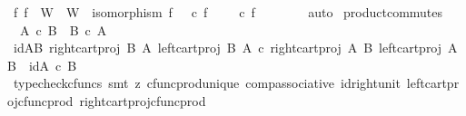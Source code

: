 \begin{isabellebody}
\ {\isachardoublequoteopen}{\isasymexists}f{\isachardot}{\kern0pt}\ f\ {\isacharcolon}{\kern0pt}\ W\ {\isasymrightarrow}\ W{\isacharprime}{\kern0pt}\ {\isasymand}\ isomorphism\ f\ {\isasymand}\ {\isasympi}{\isacharprime}{\kern0pt}\ {\isasymcirc}\isactrlsub c\ f\ {\isacharequal}{\kern0pt}\ {\isasympi}\ {\isasymand}\ {\isasympi}{\isacharprime}{\kern0pt}\ {\isasymcirc}\isactrlsub c\ f\ {\isacharequal}{\kern0pt}\ {\isasympi}\isanewline
\ \ \ \ \isamarkupfalse%
\ auto\isanewline
{}\isamarkupfalse%
%
\endisatagproof
{\isafoldproof}%
%
\isadelimproof
\isanewline
%
\endisadelimproof
\isanewline
{}\isamarkupfalse%
\ product{\isacharunderscore}{\kern0pt}commutes{\isacharcolon}{\kern0pt}\isanewline
\ \ {\isachardoublequoteopen}A\ {\isasymtimes}\isactrlsub c\ B\ {\isasymcong}\ B\ {\isasymtimes}\isactrlsub c\ A{\isachardoublequoteclose}\isanewline
%
\isadelimproof
%
\endisadelimproof
%
\isatagproof
{}\isamarkupfalse%
\ {\isacharminus}{\kern0pt}\isanewline
\ \ \isamarkupfalse%
\ id{\isacharunderscore}{\kern0pt}AB{\isacharcolon}{\kern0pt}\ {\isachardoublequoteopen}{\isasymlangle}right{\isacharunderscore}{\kern0pt}cart{\isacharunderscore}{\kern0pt}proj\ B\ A{\isacharcomma}{\kern0pt}\ left{\isacharunderscore}{\kern0pt}cart{\isacharunderscore}{\kern0pt}proj\ B\ A{\isasymrangle}\ {\isasymcirc}\isactrlsub c\ {\isasymlangle}right{\isacharunderscore}{\kern0pt}cart{\isacharunderscore}{\kern0pt}proj\ A\ B{\isacharcomma}{\kern0pt}\ left{\isacharunderscore}{\kern0pt}cart{\isacharunderscore}{\kern0pt}proj\ A\ B{\isasymrangle}\ {\isacharequal}{\kern0pt}\ id{\isacharparenleft}{\kern0pt}A\ {\isasymtimes}\isactrlsub c\ B{\isacharparenright}{\kern0pt}{\isachardoublequoteclose}\isanewline
\ \ \ \ \isamarkupfalse%
\ {\isacharparenleft}{\kern0pt}typecheck{\isacharunderscore}{\kern0pt}cfuncs{\isacharcomma}{\kern0pt}\ smt\ {\isacharparenleft}{\kern0pt}z{}{\isacharparenright}{\kern0pt}\ cfunc{\isacharunderscore}{\kern0pt}prod{\isacharunderscore}{\kern0pt}unique\ comp{\isacharunderscore}{\kern0pt}associative{}\ id{\isacharunderscore}{\kern0pt}right{\isacharunderscore}{\kern0pt}unit{}\ left{\isacharunderscore}{\kern0pt}cart{\isacharunderscore}{\kern0pt}proj{\isacharunderscore}{\kern0pt}cfunc{\isacharunderscore}{\kern0pt}prod\ right{\isacharunderscore}{\kern0pt}cart{\isacharunderscore}{\kern0pt}proj{\isacharunderscore}{\kern0pt}cfunc{\isacharunderscore}{\kern0pt}prod{\isacharparenright}{\kern0pt}\isanewline

\end{isabellebody}

